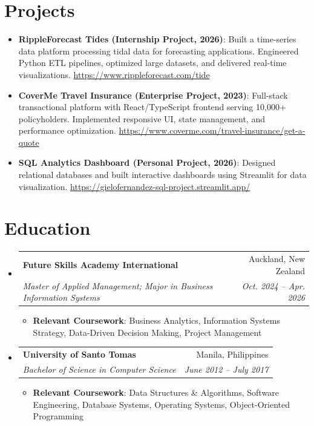 \documentclass[letterpaper,11pt]{article}
\makeatletter
\newcommand{\resumeItem}[2]{
  \item\small{
    \textbf{#1}{: #2 \vspace{-2pt}}
  }
}
\newcommand{\resumeSubheading}[4]{
  \vspace{-1pt}\item
    \begin{tabular*}{0.97\textwidth}{l@{\extracolsep{\fill}}r}
      \textbf{#1} & #2 \\
      \textit{\small#3} & \textit{\small #4} \\
    \end{tabular*}\vspace{-5pt}
}
\newcommand{\resumeSubItem}[2]{\resumeItem{#1}{#2}\vspace{-4pt}}
\newcommand{\resumeSubHeadingListStart}{\begin{itemize}[leftmargin=*]}
\newcommand{\resumeSubHeadingListEnd}{\end{itemize}}
\newcommand{\resumeItemListStart}{\begin{itemize}}
\newcommand{\resumeItemListEnd}{\end{itemize}\vspace{-5pt}}
\makeatother
\begin{document}
\section{Projects}
  \resumeSubHeadingListStart
    \resumeSubItem{RippleForecast Tides (Internship Project, 2026)}
      {Built a time-series data platform processing tidal data for forecasting applications. Engineered Python ETL pipelines, optimized large datasets, and delivered real-time visualizations. \url{https://www.rippleforecast.com/tide}}
    \resumeSubItem{CoverMe Travel Insurance (Enterprise Project, 2023)}
      {Full-stack transactional platform with React/TypeScript frontend serving 10,000+ policyholders. Implemented responsive UI, state management, and performance optimization. \url{https://www.coverme.com/travel-insurance/get-a-quote}}
    \resumeSubItem{SQL Analytics Dashboard (Personal Project, 2026)}
      {Designed relational databases and built interactive dashboards using Streamlit for data visualization. \url{https://gielofernandez-sql-project.streamlit.app/}}
  \resumeSubHeadingListEnd


\section{Education}
  \resumeSubHeadingListStart
    \resumeSubheading
      {Future Skills Academy International}{Auckland, New Zealand}
      {Master of Applied Management; Major in Business Information Systems}{Oct. 2024 -- Apr. 2026}
      \resumeItemListStart
        \resumeItem{Relevant Coursework}
          {Business Analytics, Information Systems Strategy, Data-Driven Decision Making, Project Management}
      \resumeItemListEnd
    \resumeSubheading
      {University of Santo Tomas}{Manila, Philippines}
      {Bachelor of Science in Computer Science}{June 2012 -- July 2017}
      \resumeItemListStart
        \resumeItem{Relevant Coursework}
          {Data Structures \& Algorithms, Software Engineering, Database Systems, Operating Systems, Object-Oriented Programming}
      \resumeItemListEnd
  \resumeSubHeadingListEnd


\end{document}
